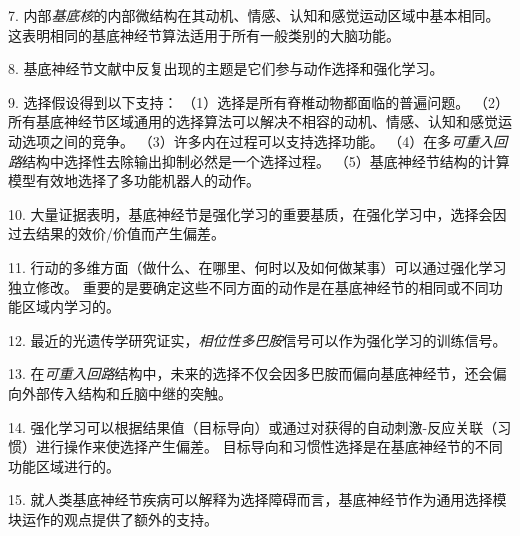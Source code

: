 7. 内部\textit{基底核}的内部微结构在其动机、情感、认知和感觉运动区域中基本相同。
这表明相同的基底神经节算法适用于所有一般类别的大脑功能。


8. 基底神经节文献中反复出现的主题是它们参与动作选择和强化学习。


9. 选择假设得到以下支持：
（1）选择是所有脊椎动物都面临的普遍问题。
（2）所有基底神经节区域通用的选择算法可以解决不相容的动机、情感、认知和感觉运动选项之间的竞争。
（3）许多内在过程可以支持选择功能。
（4）在多\textit{可重入回路}结构中选择性去除输出抑制必然是一个选择过程。
（5）基底神经节结构的计算模型有效地选择了多功能机器人的动作。 


10. 大量证据表明，基底神经节是强化学习的重要基质，在强化学习中，选择会因过去结果的效价/价值而产生偏差。


11. 行动的多维方面（做什么、在哪里、何时以及如何做某事）可以通过强化学习独立修改。
重要的是要确定这些不同方面的动作是在基底神经节的相同或不同功能区域内学习的。


12. 最近的光遗传学研究证实，\textit{相位性多巴胺}信号可以作为强化学习的训练信号。


13. 在\textit{可重入回路}结构中，未来的选择不仅会因多巴胺而偏向基底神经节，还会偏向外部传入结构和丘脑中继的突触。


14. 强化学习可以根据结果值（目标导向）或通过对获得的自动刺激-反应关联（习惯）进行操作来使选择产生偏差。
目标导向和习惯性选择是在基底神经节的不同功能区域进行的。


15. 就人类基底神经节疾病可以解释为选择障碍而言，基底神经节作为通用选择模块运作的观点提供了额外的支持。

